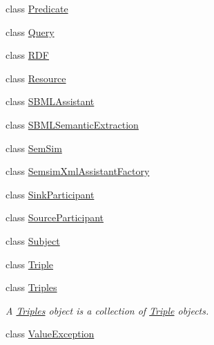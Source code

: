 \begin{DoxyCompactItemize}
\item 
class \hyperlink{classomexmeta_1_1Predicate}{Predicate}
\item 
class \hyperlink{classomexmeta_1_1Query}{Query}
\item 
class \hyperlink{classomexmeta_1_1RDF}{R\+DF}
\item 
class \hyperlink{classomexmeta_1_1Resource}{Resource}
\item 
class \hyperlink{classomexmeta_1_1SBMLAssistant}{S\+B\+M\+L\+Assistant}
\item 
class \hyperlink{classomexmeta_1_1SBMLSemanticExtraction}{S\+B\+M\+L\+Semantic\+Extraction}
\item 
class \hyperlink{classomexmeta_1_1SemSim}{Sem\+Sim}
\item 
class \hyperlink{classomexmeta_1_1SemsimXmlAssistantFactory}{Semsim\+Xml\+Assistant\+Factory}
\item 
class \hyperlink{classomexmeta_1_1SinkParticipant}{Sink\+Participant}
\item 
class \hyperlink{classomexmeta_1_1SourceParticipant}{Source\+Participant}
\item 
class \hyperlink{classomexmeta_1_1Subject}{Subject}
\item 
class \hyperlink{classomexmeta_1_1Triple}{Triple}
\item 
class \hyperlink{classomexmeta_1_1Triples}{Triples}
\begin{DoxyCompactList}\small\item\em A \hyperlink{classomexmeta_1_1Triples}{Triples} object is a collection of \hyperlink{classomexmeta_1_1Triple}{Triple} objects. \end{DoxyCompactList}\item 
class \hyperlink{classomexmeta_1_1ValueException}{Value\+Exception}
\end{DoxyCompactItemize}
